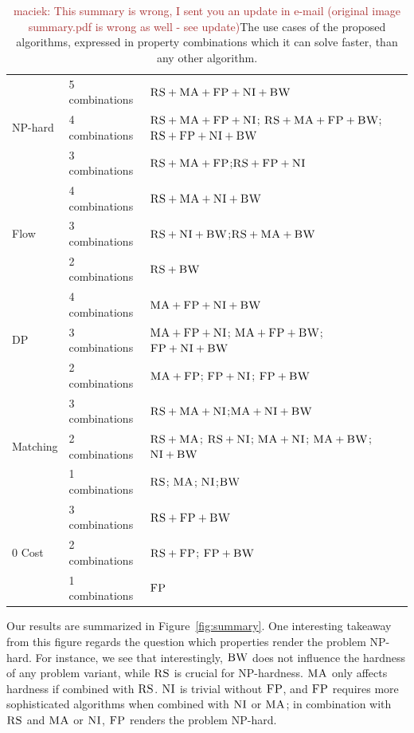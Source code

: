 \documentclass[9pt]{sigcomm-alternate}
\newcommand{\maciek}[1]{\textcolor{brown}{maciek: #1}}
\newcommand{\CC}{\textsc{NI}}
\newcommand{\FP}{\textsc{FP}}
\newcommand{\RS}{\textsc{RS}}
\newcommand{\BW}{\textsc{BW}}
\newcommand{\MA}{\textsc{MA}}
\begin{document}
\begin{table}
 

\begin{small}
\begin{tabular}{|l|l|p{4cm}|}
\hline
\multirow{3}{*}{NP-hard} & 5 combinations & \mbox{$\RS+\MA+\FP+\CC+\BW$}\\ 
\cline{2-3}
 & 4 combinations &  \mbox{$\RS+\MA+\FP+\CC$}; \mbox{$\RS+\MA+\FP+\BW$}; 
\mbox{$\RS+\FP+\CC+\BW$} \\ \cline{2-3}
 & 3 combinations &\mbox{$\RS+\MA+\FP$};\mbox{$\RS+\FP+\CC$} \\ 
 \hline
 \hline
\multirow{3}{*}{Flow} & 4 combinations & \mbox{$\RS+\MA+\CC+\BW$} \\ \cline{2-3}
 & 3 combinations & \mbox{$\RS+\CC+\BW$};\mbox{$\RS+\MA+\BW$}    \\ \cline{2-3}
 & 2 combinations &$\RS+\BW$ \\ 
 \hline
 \hline
\multirow{3}{*}{DP} & 4 combinations & \mbox{$\MA+\FP+\CC+\BW$} \\ \cline{2-3}
 & 3 combinations &   \mbox{$\MA+\FP+\CC$};  
\mbox{$\MA+\FP+\BW$}; \mbox{$\FP+\CC+\BW$} \\ \cline{2-3}
 & 2 combinations &\mbox{$\MA+\FP$}; \mbox{$\FP+\CC$};  
\mbox{$\FP+\BW$} \\ 
 \hline
 \hline
\multirow{3}{*}{Matching} &3 combinations& 
\mbox{$\RS+\MA+\CC$};\mbox{$\MA+\CC+\BW$}  \\ 
\cline{2-3}
 & 2 combinations & \mbox{$\RS+\MA$}; 
\mbox{$\RS+\CC$}; \mbox{$\MA+\CC$}; 
\mbox{$\MA+\BW$};\mbox{$\CC+\BW$} \\ \cline{2-3} 
& 1 combinations & \mbox{$\RS$}; \mbox{$\MA$}; 
\mbox{$\CC$};\mbox{$\BW$}\\
 \hline
 \hline
 \multirow{3}{*}{0 Cost} & 3 combinations & \mbox{$\RS+\FP+\BW$}\\ 
\cline{2-3}
 & 2 combinations & \mbox{$\RS+\FP$}; \mbox{$\FP+\BW$}  
\\ \cline{2-3}
 & 1 combinations & \mbox{$\FP$}\\ 
 \hline
\end{tabular}
\end{small}
\caption{\maciek{This summary is wrong, I sent you an update in e-mail
  (original image summary.pdf is wrong as well - see update)}The use cases of the proposed algorithms, expressed in property 
combinations which it can solve faster, than any other algorithm.}
\label{tab:summary}
\end{table}


Our results are summarized in
Figure~\ref{fig:summary}.
One interesting takeaway from this figure regards
the question which properties render the problem
NP-hard. For instance, we see that interestingly, $\BW$
does not influence the hardness of any problem variant,
while $\RS$ is crucial for NP-hardness.
$\MA$ only affects hardness if combined with $\RS$.
$\CC$ is trivial without $\FP$, and $\FP$ requires
more sophisticated algorithms when combined with $\CC$ or $\MA$;
in combination with $\RS$ and $\MA$ or $\CC$, $\FP$ renders the
problem NP-hard.
\end{document}
